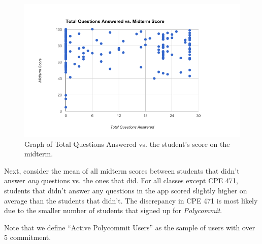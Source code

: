 \begin{figure}[ht]
	\includegraphics[width=1.0\linewidth]{figures/cramming-data}
	\caption{Graph of Total Questions Answered vs. the student's score on the midterm.}
	\label{fig:cramming}
\end{figure}
 
 \par Next, consider the mean of all midterm scores between students that didn't answer \textit{any} questions vs. the ones that did. For all classes except CPE 471, students that didn't answer any questions in the app scored slightly higher on average than the students that didn't. The discrepancy in CPE 471 is most likely due to the smaller number of students that signed up for \textit{Polycommit}.
 
 \par Note that we define ``Active Polycommit Users'' as the sample of users with over 5 commitment. 
  
